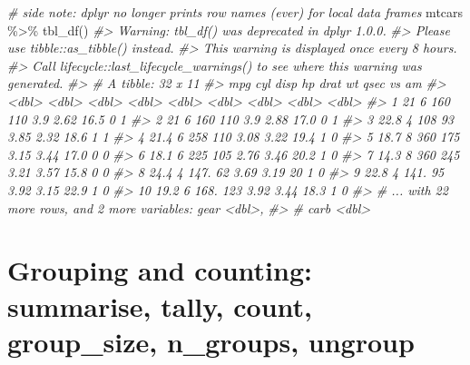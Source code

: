 \documentclass[
]{book}
\newenvironment{Shaded}{\begin{snugshade}}{\end{snugshade}}
\newcommand{\CommentTok}[1]{\textcolor[rgb]{0.56,0.35,0.01}{\textit{#1}}}
\newcommand{\FunctionTok}[1]{\textcolor[rgb]{0.00,0.00,0.00}{#1}}
\newcommand{\NormalTok}[1]{#1}
\newcommand{\SpecialCharTok}[1]{\textcolor[rgb]{0.00,0.00,0.00}{#1}}
\begin{document}
\begin{Shaded}
\begin{Highlighting}[]
\CommentTok{\# side note: dplyr no longer prints row names (ever) for local data frames}
\NormalTok{mtcars }\SpecialCharTok{\%\textgreater{}\%} \FunctionTok{tbl\_df}\NormalTok{()}
\CommentTok{\#\textgreater{} Warning: \textasciigrave{}tbl\_df()\textasciigrave{} was deprecated in dplyr 1.0.0.}
\CommentTok{\#\textgreater{} Please use \textasciigrave{}tibble::as\_tibble()\textasciigrave{} instead.}
\CommentTok{\#\textgreater{} This warning is displayed once every 8 hours.}
\CommentTok{\#\textgreater{} Call \textasciigrave{}lifecycle::last\_lifecycle\_warnings()\textasciigrave{} to see where this warning was generated.}
\CommentTok{\#\textgreater{} \# A tibble: 32 x 11}
\CommentTok{\#\textgreater{}      mpg   cyl  disp    hp  drat    wt  qsec    vs    am}
\CommentTok{\#\textgreater{}    \textless{}dbl\textgreater{} \textless{}dbl\textgreater{} \textless{}dbl\textgreater{} \textless{}dbl\textgreater{} \textless{}dbl\textgreater{} \textless{}dbl\textgreater{} \textless{}dbl\textgreater{} \textless{}dbl\textgreater{} \textless{}dbl\textgreater{}}
\CommentTok{\#\textgreater{}  1  21       6  160    110  3.9   2.62  16.5     0     1}
\CommentTok{\#\textgreater{}  2  21       6  160    110  3.9   2.88  17.0     0     1}
\CommentTok{\#\textgreater{}  3  22.8     4  108     93  3.85  2.32  18.6     1     1}
\CommentTok{\#\textgreater{}  4  21.4     6  258    110  3.08  3.22  19.4     1     0}
\CommentTok{\#\textgreater{}  5  18.7     8  360    175  3.15  3.44  17.0     0     0}
\CommentTok{\#\textgreater{}  6  18.1     6  225    105  2.76  3.46  20.2     1     0}
\CommentTok{\#\textgreater{}  7  14.3     8  360    245  3.21  3.57  15.8     0     0}
\CommentTok{\#\textgreater{}  8  24.4     4  147.    62  3.69  3.19  20       1     0}
\CommentTok{\#\textgreater{}  9  22.8     4  141.    95  3.92  3.15  22.9     1     0}
\CommentTok{\#\textgreater{} 10  19.2     6  168.   123  3.92  3.44  18.3     1     0}
\CommentTok{\#\textgreater{} \# ... with 22 more rows, and 2 more variables: gear \textless{}dbl\textgreater{},}
\CommentTok{\#\textgreater{} \#   carb \textless{}dbl\textgreater{}}
\end{Highlighting}
\end{Shaded}

\hypertarget{grouping-and-counting-summarise-tally-count-group_size-n_groups-ungroup}{%
\chapter{Grouping and counting: summarise, tally, count, group\_size, n\_groups, ungroup}\label{grouping-and-counting-summarise-tally-count-group_size-n_groups-ungroup}}
\end{document}
